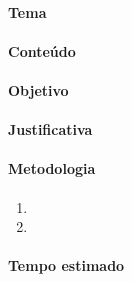 \documentclass[12pt]{extarticle}
\begin{document}

\paragraph{Tema}

\paragraph{Conteúdo}

\paragraph{Objetivo}

\paragraph{Justificativa}

\paragraph{Metodologia}
\begin{enumerate}
	\item
	\item
\end{enumerate}

\paragraph{Tempo estimado}
\end{document}
